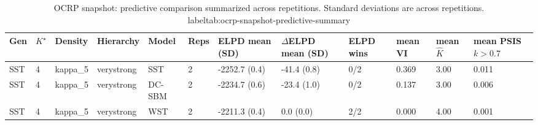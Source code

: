 \begin{table}[!h]
\centering
\caption{OCRP snapshot: predictive comparison summarized across repetitions. Standard deviations are across repetitions.\\label{tab:ocrp-snapshot-predictive-summary}}
\centering
\begin{tabular}[t]{llllllllllll}
\toprule
Gen & $K^\star$ & Density & Hierarchy & Model & Reps & ELPD mean (SD) & $\Delta$ELPD mean (SD) & ELPD wins & mean VI & mean $\hat K$ & mean PSIS $k>0.7$\\
\midrule
SST & 4 & kappa_5 & verystrong & SST & 2 & -2252.7 (0.4) & -41.4 (0.8) & 0/2 & 0.369 & 3.00 & 0.011\\
SST & 4 & kappa_5 & verystrong & DC-SBM & 2 & -2234.7 (0.6) & -23.4 (1.0) & 0/2 & 0.137 & 3.00 & 0.006\\
SST & 4 & kappa_5 & verystrong & WST & 2 & -2211.3 (0.4) & 0.0 (0.0) & 2/2 & 0.000 & 4.00 & 0.001\\
\bottomrule
\end{tabular}
\end{table}
